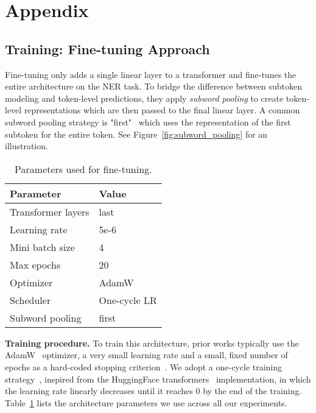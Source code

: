 \newpage
\appendix
\clearpage
\newpage
\section{Appendix}

\subsection{Training: Fine-tuning Approach}

Fine-tuning only adds a single linear layer to a transformer and fine-tunes the entire architecture on the NER task. To bridge the difference between subtoken modeling and token-level predictions, they apply \textit{subword pooling} to create token-level representations which are then passed to the final linear layer. A common subword pooling strategy is "first"~\cite{devlin-etal-2019-bert} which uses the representation of the first subtoken for the entire token. See Figure~\ref{fig:subword_pooling} for an illustration. 

\begin{table}[h]
\begin{center}
\begin{tabular}{ l l }
\toprule
Parameter & Value \\
\midrule
Transformer layers & last \\
Learning rate & 5e-6 \\
Mini batch size & 4 \\
Max epochs & 20 \\
Optimizer & AdamW \\ %
Scheduler & One-cycle LR \\
Subword pooling & first \\
\bottomrule
\end{tabular}
\end{center}
\vspace{-2mm}
\caption{\label{tab:finetuning_params} Parameters used for fine-tuning.}
\end{table}

\noindent 
\textbf{Training procedure.} 
To train this architecture, prior works typically use the AdamW~\cite{loshchilov2018decoupled} optimizer, a very small learning rate and a small, fixed number of epochs as a hard-coded stopping criterion~\cite{conneau2019unsupervised}. We adopt a one-cycle training strategy~\cite{2018arXiv180309820S}, inspired from the HuggingFace transformers~\cite{wolf2019huggingface} implementation, in which the learning rate linearly decreases until it reaches $0$ by the end of the training. Table~\ref{tab:finetuning_params} lists the architecture parameters we use across all our experiments. 

